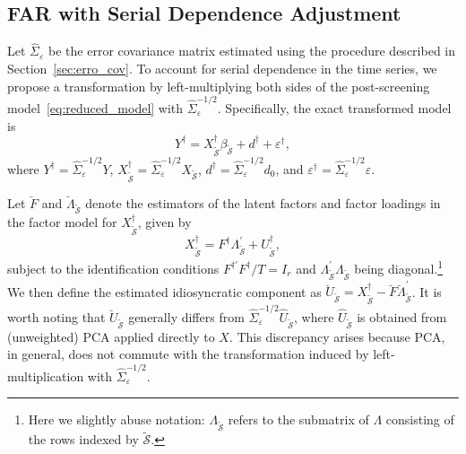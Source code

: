 ﻿\documentclass[12pt]{article}
\newcommand{\0}{\mbox{\bf 0}}
\theoremstyle{plain}%
\theoremstyle{definition}
\begin{document}
\subsection{FAR with Serial Dependence Adjustment}
\label{sec:serial_adjust}


Let $\widehat{\Sigma}_{\varepsilon}$ be the error covariance matrix estimated using the procedure described in Section~\ref{sec:erro_cov}. To account for serial dependence in the time series, we propose a transformation by left-multiplying both sides of the post-screening model~\eqref{eq:reduced_model} with $\widehat{\Sigma}_{\varepsilon}^{-1/2}$. Specifically, the exact transformed model is
\begin{equation}  \label{eq:reduced_transform}
Y^{\dagger}
=X^{\dagger}_{\widetilde{\mathcal{S}}}\beta_{\widetilde{\mathcal{S}}}
+d^\dagger+\varepsilon^{\dagger},
\end{equation}
where $Y^{\dagger}=\widehat{\Sigma}^{-1/2}_{\varepsilon}Y$,
$X^{\dagger}_{\widetilde{\mathcal{S}}}
=\widehat{\Sigma}^{-1/2}_{\varepsilon}X_{\widetilde{\mathcal{S}}}$,
$d^\dagger=\widehat{\Sigma}^{-1/2}_{\varepsilon}d_0$, and
$\varepsilon^{\dagger}
=\widehat{\Sigma}^{-1/2}_{\varepsilon}\varepsilon$.


Let $\breve{F}$ and $\breve{\Lambda}_{\widetilde{\mathcal{S}}}$ denote the estimators of the latent factors and factor loadings in the factor model for $X^{\dagger}_{\widetilde{\mathcal{S}}}$, given by
\[
X^{\dagger}_{\widetilde{\mathcal{S}}} = F^{\dagger} \Lambda^{\prime}_{\widetilde{\mathcal{S}}} + U^{\dagger}_{\widetilde{\mathcal{S}}},
\]
subject to the identification conditions $F^{\dagger\prime}F^{\dagger}/T = I_r$ and $\Lambda^{\prime}_{\widetilde{\mathcal{S}}} \Lambda_{\widetilde{\mathcal{S}}}$ being diagonal.\footnote{Here we slightly abuse notation: $\Lambda_{\widetilde{\mathcal{S}}}$ refers to the submatrix of $\Lambda$ consisting of the rows indexed by $\widetilde{\mathcal{S}}$.} 
We then define the estimated idiosyncratic component as $\breve{U}_{\widetilde{\mathcal{S}}} = X^{\dagger}_{\widetilde{\mathcal{S}}} - \breve{F} \breve{\Lambda}^{\prime}_{\widetilde{\mathcal{S}}}$. It is worth noting that $\breve{U}_{\widetilde{\mathcal{S}}}$ generally differs from $\widehat{\Sigma}_{\varepsilon}^{-1/2} \widehat{U}_{\widetilde{\mathcal{S}}}$, where $\widehat{U}_{\widetilde{\mathcal{S}}}$ is obtained from (unweighted) PCA applied directly to $X$. This discrepancy arises because PCA, in general, does not commute with the transformation induced by left-multiplication with $\widehat{\Sigma}_{\varepsilon}^{-1/2}$.
\end{document}
